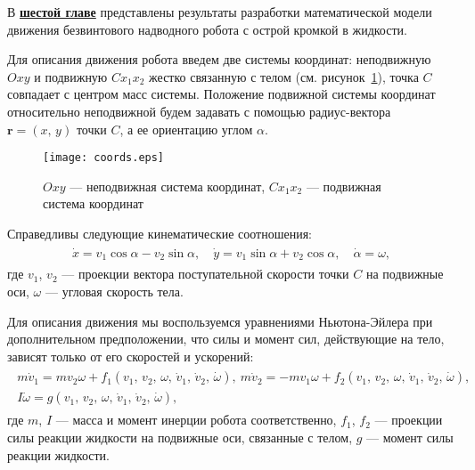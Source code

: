 В \underline{\textbf{шестой главе}} представлены результаты разработки математической модели движения безвинтового надводного робота с острой кромкой в жидкости.

Для описания движения робота введем две системы координат: неподвижную $Oxy$ и подвижную $Cx_1x_2$ жестко связанную с телом (см. рисунок~\ref{fig.coords}), точка $C$ совпадает с центром масс системы. 
Положение подвижной системы координат относительно неподвижной будем задавать с помощью радиус-вектора $\bm r = (x,\, y)$ точки $C$, а ее ориентацию углом $\alpha$. %

\begin{figure}[h!]
	\centering
	\texttt{[image: coords.eps]}
	\caption{$Oxy$ --- неподвижная система координат, $Cx_1x_2$ --- подвижная система координат}\label{fig.coords}
\end{figure}

Справедливы следующие кинематические соотношения:
\begin{gather}
\begin{gathered}
\dot{x} = v_1 \cos\alpha - v_2 \sin\alpha,\quad \dot{y} = v_1 \sin\alpha + v_2 \cos\alpha,\quad \dot{\alpha} = \omega,
\end{gathered}\label{eq.kinem}
\end{gather}
где $v_1$, $v_2$ --- проекции вектора поступательной скорости точки $C$ на подвижные оси, $\omega$ --- угловая скорость тела.

Для описания движения мы воспользуемся уравнениями Ньютона-Эйлера при дополнительном предположении, что силы и момент сил, действующие на тело, зависят только от его скоростей и ускорений: %
\begin{gather}
\begin{gathered}
m \dot{v}_1 = m v_2 \omega + f_1 (v_1,\, v_2,\, \omega,\, \dot{v}_1,\, \dot{v}_2,\, \dot \omega),\
m \dot{v}_2 = -m v_1 \omega + f_2 (v_1,\, v_2,\, \omega,\, \dot{v}_1,\, \dot{v}_2,\, \dot \omega),\\
I \dot{\omega} = g (v_1,\, v_2,\, \omega,\, \dot{v}_1,\, \dot{v}_2,\, \dot \omega),
\end{gathered}\label{eq.NE}
\end{gather}
где $m$, $I$ --- масса и момент инерции робота соответственно, $f_1$, $f_2$ --- проекции силы реакции жидкости на подвижные оси, связанные с телом, $g$ --- момент силы реакции жидкости. 

